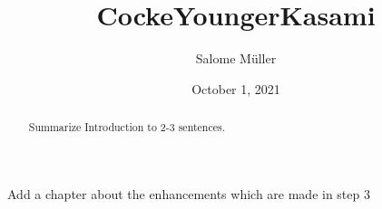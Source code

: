 \documentclass[10pt]{article}
\title{CockeYoungerKasami}
\author{Salome Müller}
\date{October 1, 2021}
\newcommand{\todo}[1]{{\color{red}#1}}
\begin{document}
\maketitle

\begin{abstract}
    \todo{Summarize Introduction to 2-3 sentences.}
\end{abstract}

\pagebreak
\tableofcontents
\pagebreak




\todo{Add a chapter about the enhancements which are made in step 3}


\end{document}
